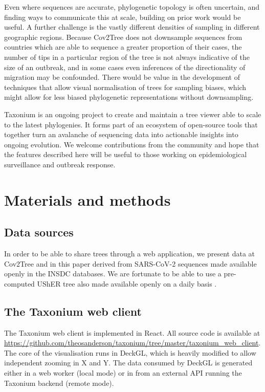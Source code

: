 \documentclass[twocolumn]{bioRxiv}
\begin{document}
Even where sequences are accurate, phylogenetic topology is often uncertain, and finding ways to communicate this at scale, building on prior work \citep{densitree} would be useful. A further challenge is the vastly different densities of sampling in different geographic regions. Because Cov2Tree does not downsample sequences from countries which are able to sequence a greater proportion of their cases, the number of tips in a particular region of the tree is not always indicative of the size of an outbreak, and in some cases even inferences of the directionality of migration may be confounded. There would be value in the development of techniques that allow visual normalisation of trees for sampling biases, which might allow for less biased phylogenetic representations without downsampling.

Taxonium is an ongoing project to create and maintain a tree viewer able to scale to the latest phylogenies. It forms part of an ecosystem of open-source tools that together turn an avalanche of sequencing data into actionable insights into ongoing  evolution. We welcome contributions from the community and hope that the features described here will be useful to those working on epidemiological surveillance and outbreak response.

\clearpage{}
\section*{Materials and methods}

\subsection*{Data sources}
In order to be able to share trees through a web application, we present data at Cov2Tree and in this paper derived from SARS-CoV-2 sequences made available openly in the INSDC databases. We are fortunate to be able to use a pre-computed UShER tree also made available openly on a daily basis \citep{McBroome2021}.

\subsection*{The Taxonium web client}
The Taxonium web client is implemented in React. All source code is available at \url{https://github.com/theosanderson/taxonium/tree/master/taxonium_web_client}. The core of the visualisation runs in DeckGL, which is heavily modified to allow independent zooming in X and Y. The data consumed by DeckGL is generated either in a web worker (local mode) or in from an external API running the Taxonium backend (remote mode).
\end{document}
